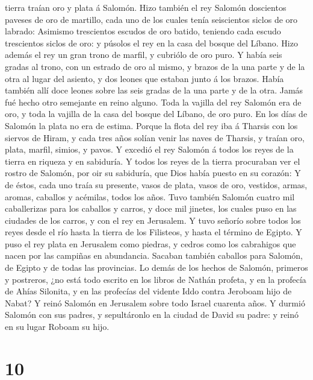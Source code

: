 tierra traían oro y plata á Salomón.  Hizo también el rey
Salomón doscientos paveses de oro de martillo, cada uno de los cuales
tenía seiscientos siclos de oro labrado:  Asimismo
trescientos escudos de oro batido, teniendo cada escudo trescientos
siclos de oro: y púsolos el rey en la casa del bosque del Líbano.
 Hizo además el rey un gran trono de marfil, y cubriólo de
oro puro.  Y había seis gradas al trono, con un estrado de
oro al mismo, y brazos de la una parte y de la otra al lugar del
asiento, y dos leones que estaban junto á los brazos. 
Había también allí doce leones sobre las seis gradas de la una parte y
de la otra. Jamás fué hecho otro semejante en reino alguno.
 Toda la vajilla del rey Salomón era de oro, y toda la
vajilla de la casa del bosque del Líbano, de oro puro. En los días de
Salomón la plata no era de estima.  Porque la flota del rey
iba á Tharsis con los siervos de Hiram, y cada tres años solían venir
las naves de Tharsis, y traían oro, plata, marfil, simios, y pavos.
 Y excedió el rey Salomón á todos los reyes de la tierra en
riqueza y en sabiduría.  Y todos los reyes de la tierra
procuraban ver el rostro de Salomón, por oir su sabiduría, que Dios
había puesto en su corazón:  Y de éstos, cada uno traía su
presente, vasos de plata, vasos de oro, vestidos, armas, aromas,
caballos y acémilas, todos los años.  Tuvo también Salomón
cuatro mil caballerizas para los caballos y carros, y doce mil jinetes,
los cuales puso en las ciudades de los carros, y con el rey en
Jerusalem.  Y tuvo señorío sobre todos los reyes desde el
río hasta la tierra de los Filisteos, y hasta el término de Egipto.
 Y puso el rey plata en Jerusalem como piedras, y cedros
como los cabrahigos que nacen por las campiñas en abundancia.
 Sacaban también caballos para Salomón, de Egipto y de
todas las provincias.  Lo demás de los hechos de Salomón,
primeros y postreros, ¿no está todo escrito en los libros de Nathán
profeta, y en la profecía de Ahías Silonita, y en las profecías del
vidente Iddo contra Jeroboam hijo de Nabat?  Y reinó
Salomón en Jerusalem sobre todo Israel cuarenta años.  Y
durmió Salomón con sus padres, y sepultáronlo en la ciudad de David su
padre: y reinó en su lugar Roboam su hijo.

\hypertarget{section-9}{%
\section{10}\label{section-9}}

